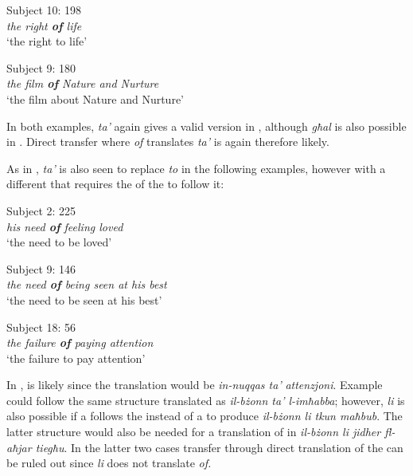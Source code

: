 \documentclass[output=paper]{langsci/langscibook}
\begin{document}
\begin{exe}  
  \ex{}
  {Subject 10: 198}\\
    \textit{the right \textbf{of} life}\\
    {‘the right to life’}
  \label{ex20}
\end{exe}

\begin{exe}  
  \ex{}
  {Subject 9: 180}\\
    \textit{the film \textbf{of} Nature and Nurture}\\
    {‘the film about Nature and Nurture’}
  \label{ex21}
\end{exe}


In both examples, \textit{ta’} again gives a valid version in ,
although \textit{għal} is also possible in . Direct transfer where
\textit{of} translates \textit{ta’} is again therefore likely.


As in , \textit{ta’} is also seen to replace \textit{to} in the
following examples, however with a different  that requires
the  of the  to follow it:


\begin{exe}  
  \ex{}
  {Subject 2: 225}\\
    \textit{his need \textbf{of} feeling loved}\\
    {‘the need to be loved’}
  \label{ex22}
\end{exe}

\begin{exe}  
  \ex{}
  {Subject 9: 146}\\
    \textit{the need \textbf{of} being seen at his best}\\
    {‘the need to be seen at his best’}
  \label{ex23}
\end{exe}

\begin{exe}  
  \ex{}
  {Subject 18: 56}\\
    \textit{the failure \textbf{of} paying attention}\\
    {‘the failure to pay attention’}
  \label{ex24}
\end{exe}

In ,  is likely since the  translation would
be \textit{in-nuqqas ta’} \textit{attenzjoni}. Example  could
follow the same structure translated as \textit{il-bżonn ta’
  l-imħabba}; however, \textit{li} is also possible if a  follows
the  instead of a  to produce \textit{il-bżonn li tkun
  maħbub}. The latter structure would also be needed for a translation
of  in \textit{il-bżonn li jidher fl-aħjar tiegħu}. In the latter
two cases transfer through direct translation of the  can
be ruled out since \textit{li} does not translate \textit{of.}
\end{document}
